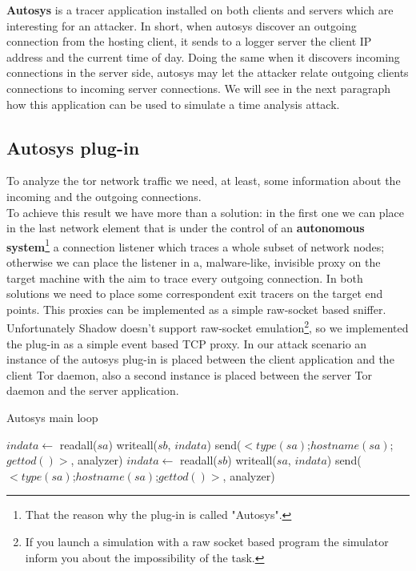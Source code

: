 \textbf{Autosys} is a tracer application installed on both clients and
servers which are interesting for an attacker.  
In short, when autosys discover an outgoing connection from the
hosting client, it sends to a logger server the client IP address and
the current time of day. Doing the same when it discovers incoming
connections in the server side, autosys may let the attacker relate outgoing
clients connections 
 to incoming server connections. We will see in the next
paragraph how this application can be used to simulate a time analysis
attack.
\subsection{Autosys plug-in}
To analyze the tor network traffic we need, at least, some information about
the incoming and the outgoing connections.\\
To achieve this result we have more than a solution: in the first one we can place 
in the last network element that is under the control of an \textbf{autonomous system}\footnote{
That the reason why the plug-in is called "Autosys".} a connection
listener which traces a whole subset of
network nodes;
otherwise we can place the listener in a, malware-like, invisible proxy on the target
machine with the aim to trace every outgoing connection. 
In both solutions we need to place some correspondent exit tracers on
the target end points.
This proxies can be implemented as a simple raw-socket based sniffer. 
Unfortunately Shadow doesn't support raw-socket
emulation\footnote{If you launch a simulation with a raw socket based program the simulator
inform you about the impossibility of the task.},
so we implemented the plug-in as a simple event based TCP
proxy. In our attack scenario an instance of the autosys plug-in is placed 
between the client application and the client Tor daemon, also a second
 instance is placed between the server Tor daemon and the server application.
\\
\begin{algorithm}
\caption{Autosys main loop}
\begin{algorithmic}[1]
			\State $indata \gets $ readall($sa$)
			\State writeall($sb$, $indata$)
				\State send($<type(sa)$;$hostname(sa)$;$gettod()>$, analyzer)
			\EndIf
		\EndIf
			\State $indata \gets $ readall($sb$)
			\State writeall($sa$, $indata$)
				\State send($<type(sa)$;$hostname(sa)$;$gettod()>$, analyzer)
			\EndIf
		\EndIf
	\EndWhile
\EndFunction
\end{algorithmic}
\label{alg:auto_main}
\end{algorithm}

